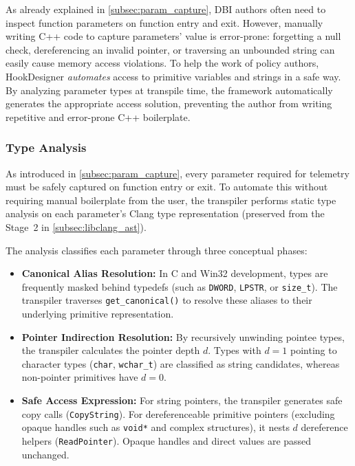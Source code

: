 As already explained in \cref{subsec:param_capture}, \ac{DBI} authors often need to inspect function parameters on function entry and exit.
However, manually writing C++ code to capture parameters' value is error-prone: forgetting a null check, dereferencing an invalid pointer, or traversing an unbounded string can easily cause memory access violations.
To help the work of policy authors, HookDesigner \emph{automates} access to primitive variables and strings in a safe way.
By analyzing parameter types at transpile time, the framework automatically generates the appropriate access solution, preventing the author from writing repetitive and error-prone C++ boilerplate.

\subsubsection{Type Analysis}

As introduced in \cref{subsec:param_capture}, every parameter required for telemetry must be safely captured on function entry or exit.
To automate this without requiring manual boilerplate from the user, the transpiler performs static type analysis on each parameter's Clang type representation (preserved from the Stage~2 in \cref{subsec:libclang_ast}).

The analysis classifies each parameter through three conceptual phases:
\begin{itemize}
	\item \textbf{Canonical Alias Resolution:} In C and Win32 development, types are frequently masked behind typedefs (such as \texttt{DWORD}, \texttt{LPSTR}, or \texttt{size\_t}). The transpiler traverses \texttt{get\_canonical()} to resolve these aliases to their underlying primitive representation.
	\item \textbf{Pointer Indirection Resolution:} By recursively unwinding pointee types, the transpiler calculates the pointer depth $d$. Types with $d = 1$ pointing to character types (\texttt{char}, \texttt{wchar\_t}) are classified as string candidates, whereas non-pointer primitives have $d = 0$.
	\item \textbf{Safe Access Expression:} For string pointers, the transpiler generates safe copy calls (\texttt{CopyString}). For dereferenceable primitive pointers (excluding opaque handles such as \texttt{void*} and complex structures), it nests $d$ dereference helpers (\texttt{ReadPointer}). Opaque handles and direct values are passed unchanged.
\end{itemize}

